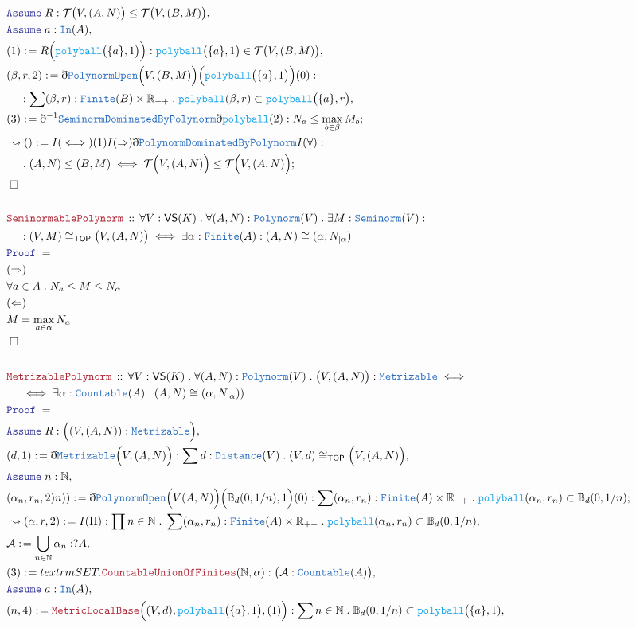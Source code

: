 \documentclass[12pt]{scrartcl}
\newcommand{\TYPE}[1]{\textcolor{NavyBlue}{\mathtt{#1}}}
\newcommand{\FUNC}[1]{\textcolor{Cerulean}{\mathtt{#1}}}
\newcommand{\LOGIC}[1]{\textcolor{Blue}{\mathtt{#1}}}
\newcommand{\THM}[1]{\textcolor{Maroon}{\mathtt{#1}}}
\renewcommand{\.}{\; . \;}
\newcommand{\de}{: \kern 0.1pc =}
\newcommand{\Theorem}[2]{& \THM{#1} \, :: \, #2 \\ & \Proof = \\ }
\newcommand{\NewLine}{\\ & \kern 1pc}
\newcommand{\Page}[1]{\begin{align*} #1 \end{align*} \newpage   }
\newcommand{ \bd }{ \ByDef }
\newcommand{\Reals}{\mathbb{R} }
\newcommand{\Nat}{\mathbb{N} }
\newcommand{\Say}[3]{& #1 \de #2 : #3, \\}
\newcommand{\Conclude}[3]{& #1 \de #2 : #3; \\}
\newcommand{\Derive}[3]{& \leadsto #1 \de #2 : #3, \\}
\newcommand{\DeriveConclude}[3]{& \leadsto #1 \de #2 : #3 ; \\}
\newcommand{\A}{\LOGIC{Assume} \;}
\newcommand{\Assume}[2]{& \A #1 : #2, \\}
\newcommand{\QED}{\; \square}
\newcommand{\EndProof}{& \QED \\}
\newcommand{\ByDef}{\eth}
\newcommand{\Proof}{\LOGIC{Proof} \; }
\newcommand{\TOP}{ \mathsf{TOP}  }
\begin{document}
{ } \Page{
 \Assume{R}{ \mathcal{T}\big(V, (A,N) \big) \le \mathcal{T}\big(V, (B,M) \big) }
 \Assume{a}{\TYPE{In}(A)}
 \Say{(1)}{R\Big( \FUNC{polyball}\big(\{a\} ,1 \big) \Big)}{ \FUNC{polyball}\big(\{a\},1 \big) \in \mathcal{T}\big(V, (B,M) \big)  }
 \Say{(\beta,r,2) }{ \bd \TYPE{PolynormOpen}\Big(V, (B,M) \Big)\Big( \FUNC{polyball}\big( \{a\},1 \big)  \Big)(0)  }{ 
 \NewLine :
 \sum (\beta,r) : \TYPE{Finite}(B)\times \Reals_{++} \. 
 \FUNC{polyball}(\beta,r) \subset \FUNC{polyball}\big( \{a\}  ,r \big)
 }
 \Conclude{(3)}{  \bd^{-1} \TYPE{SeminormDominatedByPolynorm}  \bd \FUNC{polyball}(2)}{  N_a \le \max_{b \in \beta} M_b }
 \DeriveConclude{()}{ I(\iff)(1) I(\Rightarrow)  \bd \TYPE{PolynormDominatedByPolynorm}  I(\forall)  }{  \NewLine \. (A,N) \le (B,M) \iff 
 \mathcal{T}\Big(V, (A,N) \Big) \le \mathcal{T}\Big(V,(A,N)\Big)}
 \EndProof
 \\
 \Theorem{SeminormablePolynorm}{ \forall V : \mathsf{VS}(K) \. \forall (A,N) : \TYPE{Polynorm}(V) \. 
 \exists M : \TYPE{Seminorm}(V) : \NewLine : (V,M) \cong_{\TOP} \big(V,(A,N) \big) \iff
 \exists \alpha : \TYPE{Finite}(A)  : (A,N) \cong (\alpha,N_{|\alpha})
 } 
 & (\Rightarrow) \\
 & \forall a \in A \.   N_a \le M \le N_\alpha  \\
 & (\Leftarrow) \\
 &  M = \max_{a \in \alpha} N_a \\
 \EndProof \\
 \Theorem{MetrizablePolynorm}{ \forall V : \mathsf{VS}(K) \. \forall (A,N) : \TYPE{Polynorm}(V) \.
  \big(V,(A,N)\big) : \TYPE{Metrizable} \iff \NewLine \iff \exists \alpha : \TYPE{Countable}(A) \. (A,N) \cong (\alpha,N_{|\alpha} )  ) 
 }
 \Assume{R}{ \Big( (V,(A,N)) : \TYPE{Metrizable}  \Big)  }
 \Say{(d,1)}{ \bd \TYPE{Metrizable}\Big(V,(A,N) \Big) }{ \sum d : \TYPE{Distance}(V) \. (V,d) \cong_\TOP \Big( V, (A,N) \Big) }
 \Assume{n}{\Nat}
 \Conclude{(\alpha_n,r_n,2)n))}{\bd \TYPE{PolynormOpen}\Big(V (A,N) \Big)\Big( \mathbb{B}_d(0,1/n), 1 \Big)(0)}
  {\sum (\alpha_n,r_n) : \TYPE{Finite}(A) \times \Reals_{++} \. \FUNC{polyball}(\alpha_n,r_n) \subset \mathbb{B}_d(0,1/n) }
 \Derive{(\alpha,r,2)}{I(\Pi)}
  { \prod n \in \Nat \. \sum (\alpha_n,r_n) : \TYPE{Finite}(A) \times \Reals_{++} \. \FUNC{polyball}(\alpha_n,r_n) \subset \mathbb{B}_d(0,1/n)  }
 \Say{\mathcal{A}}{ \bigcup_{n \in \Nat} \alpha_n }{?A}
 \Say{ (3)  }{ textrm{SET.}{\THM{CountableUnionOfFinites}}(\Nat,\alpha) }{ \big( \mathcal{A} : \TYPE{Countable}(A) \big)  }
 \Assume{ a }{\TYPE{In}(A)}
 \Say{(n,4)}{\THM{MetricLocalBase}\Big((V,d),\FUNC{polyball}\big(\{a\},1\big),(1)\Big)}{ \sum n \in \Nat \. \mathbb{B}_d(0,1/n) \subset \FUNC{polyball}\big(\{a\},1)}
}
\end{document}
